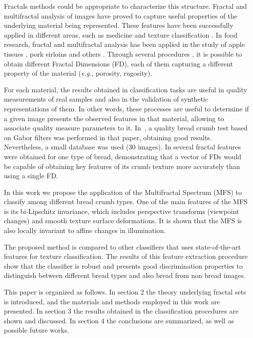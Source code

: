 \documentclass[a4paper,10pt]{article}
\begin{document}
Fractals methods could be appropriate to characterize this structure. Fractal and multifractal analysis of images have proved to capture useful properties of the underlying material being represented. These features have been successfully applied in different areas, such as medicine \cite{Andjelkovic2008,Yu2011} and texture classification \cite{Wendt2009}. In food research, fractal and multifractal analysis has been applied in the study of apple tissues \cite{Mendoza2010}, pork sirloins \cite{Serrano2012} and others \cite{Quevedo2002}. Through several procedures \cite{Peitgen2004, Gonzales2008}, it is possible to obtain different Fractal Dimensions (FD), each of them capturing a different property of the material ({\em e.g.}, porosity, rugosity).

For each material, the results obtained in classification tasks are useful in quality measurements of real samples and also in the validation of synthetic representations of them. In other words, these processes are useful to determine if a given image presents the observed features in that material, allowing to associate quality measure parameters to it. In~\cite{Fan2006}, a quality bread crumb test based on Gabor filters was performed in that paper, obtaining good results. Nevertheless, a small database was used ($30$ images). In \cite{Gonzales2008} several fractal features were obtained for one type of bread, demonstrating that a vector of FDs would be capable of obtaining key features of its crumb texture more accurately than using a single FD.

In this work we propose the application of the Multifractal Spectrum (MFS) \cite{Xu2006} to classify among different bread crumb types. One of the main features of the MFS is its bi-Lipschitz invariance, which includes perspective transforms (viewpoint changes) and smooth texture surface deformations. It is shown that the MFS is also locally invariant to affine changes in illumination.

The proposed method is compared to other classifiers that uses state-of-the-art features for texture classification. The results of this feature extraction procedure show that the classifier is robust and presents good discrimination properties to distinguish between different bread types and also bread from non bread images. 

This paper is organized as follows. In section 2 the theory underlying fractal sets is introduced, and the materials and methods employed in this work are presented. In section 3 the results obtained in the classification procedures are shown and discussed. In section 4 the conclusions are summarized, as well as possible future works.
\end{document}

